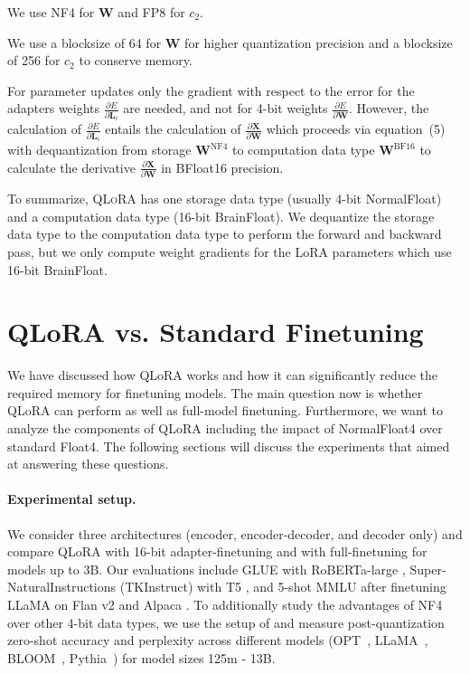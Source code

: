We use NF4 for $\mathbf{W}$ and FP8 for $c_2$.

We use a blocksize of 64 for $\mathbf{W}$ for higher quantization precision and a blocksize of 256 for $c_2$ to conserve memory.

For parameter updates only the gradient with respect to the error for the adapters weights $\frac{\partial E}{\partial \mathbf{L}_i}$ are needed, and not for 4-bit weights $\frac{\partial E}{\partial \mathbf{W}}$. However, the calculation of $\frac{\partial E}{\partial \mathbf{L}_i}$ entails the calculation of $\frac{\partial \mathbf{X}}{\partial \mathbf{W}}$ which proceeds via equation~(5) with dequantization from storage $\mathbf{W}^{\text{NF4}}$ to computation data type $\mathbf{W}^{\text{BF16}}$ to calculate the derivative $\frac{\partial \mathbf{X}}{\partial \mathbf{W}}$ in BFloat16 precision.

To summarize, \textsc{QLoRA} has one storage data type (usually 4-bit NormalFloat) and a computation data type (16-bit BrainFloat). We dequantize the storage data type to the computation data type to perform the forward and backward pass, but we only compute weight gradients for the LoRA parameters which use 16-bit BrainFloat.

\section{QLoRA vs. Standard Finetuning}
\label{sec:comp_to_std}

We have discussed how QLoRA works and how it can significantly reduce the required memory for finetuning models. The main question now is whether QLoRA can perform as well as full-model finetuning. Furthermore, we want to analyze the components of QLoRA including the impact of NormalFloat4 over standard Float4. The following sections will discuss the experiments that aimed at answering these questions.

\paragraph{Experimental setup.} We consider three architectures (encoder, encoder-decoder, and decoder only) and compare QLoRA with 16-bit adapter-finetuning and with full-finetuning for models up to 3B. Our evaluations include GLUE \citep{wang2018glue} with RoBERTa-large \citep{liu2019roberta},  Super-NaturalInstructions (TKInstruct) \citep{wang2022super} with T5 \citep{t5}, and 5-shot MMLU \citep{hendrycksmeasuring} after finetuning LLaMA on Flan v2 \citep{longpre2023flan} and Alpaca \citep{alpaca}. To additionally study the advantages of NF4 over other 4-bit data types, we use the setup of \citet{dettmers2022case} and measure post-quantization zero-shot accuracy and perplexity across different models (OPT~\citep{zhang2022opt}, LLaMA~\citep{touvron2023llama}, BLOOM~\citep{scao2022bloom}, Pythia~\citep{biderman2023pythia}) for model sizes 125m - 13B. 

